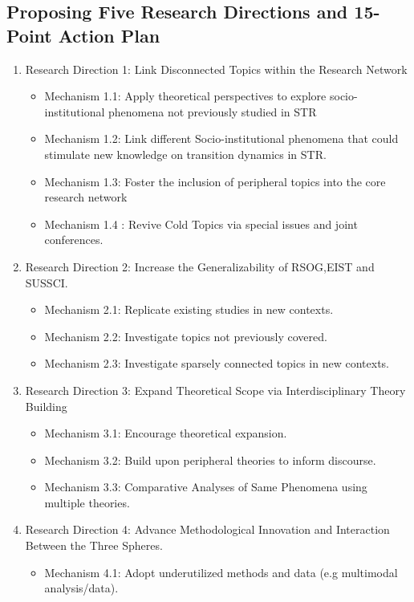 \documentclass[12pt]{article}
\begin{document}
\subsection{Proposing Five Research Directions and 15-Point Action Plan}
\label{sec:fiverd_15point}
\begin{enumerate}
    \item Research Direction 1: Link Disconnected Topics within the Research Network
\begin{itemize}
    \item Mechanism 1.1: Apply theoretical perspectives to explore socio-institutional phenomena not previously studied in STR
    \item Mechanism 1.2: Link different Socio-institutional phenomena that could stimulate new knowledge on transition dynamics in STR.
    \item Mechanism 1.3: Foster the inclusion of peripheral topics into the core research network
    \item Mechanism 1.4 : Revive Cold Topics via special issues and joint conferences.
    \end{itemize}
    \item Research Direction 2: Increase the Generalizability of RSOG,EIST and SUSSCI.
\begin{itemize}
    \item Mechanism 2.1: Replicate existing studies in new contexts.
    \item Mechanism 2.2: Investigate topics not previously covered.
    \item Mechanism 2.3: Investigate sparsely connected topics in new contexts.
    \end{itemize}
    \item Research Direction 3: Expand Theoretical Scope via Interdisciplinary Theory Building
\begin{itemize}
    \item Mechanism 3.1: Encourage theoretical expansion.
    \item Mechanism 3.2: Build upon peripheral theories to inform discourse.
    \item Mechanism 3.3: Comparative Analyses of Same Phenomena using multiple theories.
    \end{itemize}
    \item Research Direction 4: Advance Methodological Innovation and Interaction Between the Three Spheres.
\begin{itemize}
    \item Mechanism 4.1: Adopt underutilized methods and data (e.g multimodal analysis/data).

\end{itemize}
\end{enumerate}
\end{document}

